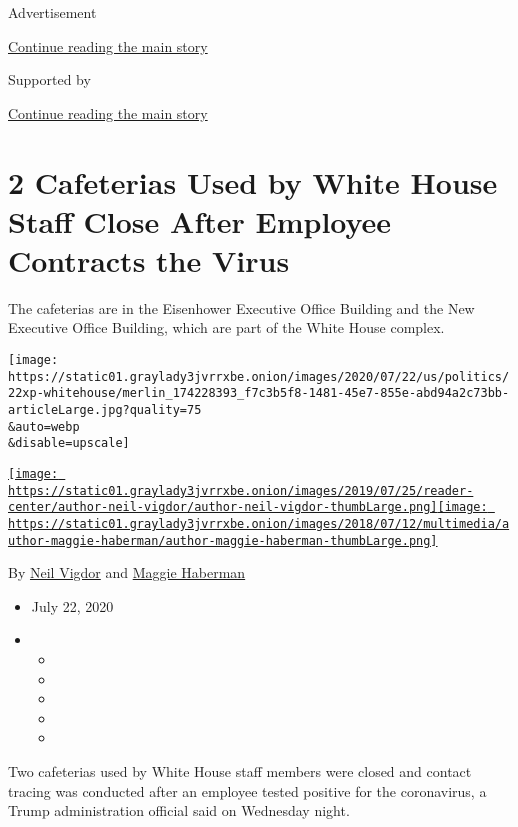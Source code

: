 Advertisement

\protect\hyperlink{after-top}{Continue reading the main story}

Supported by

\protect\hyperlink{after-sponsor}{Continue reading the main story}

\hypertarget{2-cafeterias-used-by-white-house-staff-close-after-employee-contracts-the-virus}{%
\section{2 Cafeterias Used by White House Staff Close After Employee
Contracts the
Virus}\label{2-cafeterias-used-by-white-house-staff-close-after-employee-contracts-the-virus}}

The cafeterias are in the Eisenhower Executive Office Building and the
New Executive Office Building, which are part of the White House
complex.

\texttt{[image: https://static01.graylady3jvrrxbe.onion/images/2020/07/22/us/politics/22xp-whitehouse/merlin\_174228393\_f7c3b5f8-1481-45e7-855e-abd94a2c73bb-articleLarge.jpg?quality=75\\\&auto=webp\\\&disable=upscale]}

\href{https://www.nytimes3xbfgragh.onion/by/neil-vigdor}{\texttt{[image: https://static01.graylady3jvrrxbe.onion/images/2019/07/25/reader-center/author-neil-vigdor/author-neil-vigdor-thumbLarge.png]}}\href{https://www.nytimes3xbfgragh.onion/by/maggie-haberman}{\texttt{[image: https://static01.graylady3jvrrxbe.onion/images/2018/07/12/multimedia/author-maggie-haberman/author-maggie-haberman-thumbLarge.png]}}

By \href{https://www.nytimes3xbfgragh.onion/by/neil-vigdor}{Neil Vigdor}
and \href{https://www.nytimes3xbfgragh.onion/by/maggie-haberman}{Maggie
Haberman}

\begin{itemize}
\item
  July 22, 2020
\item
  \begin{itemize}
  \item
  \item
  \item
  \item
  \item
  \end{itemize}
\end{itemize}

Two cafeterias used by White House staff members were closed and contact
tracing was conducted after an employee tested positive for the
coronavirus, a Trump administration official said on Wednesday night.

